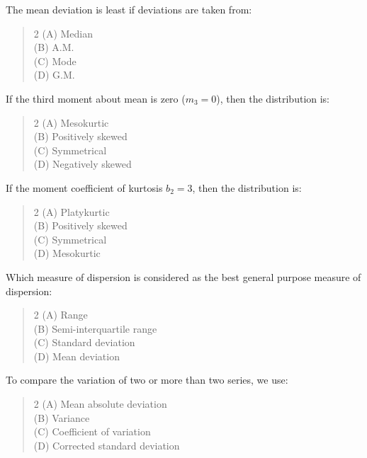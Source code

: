 \documentclass[11pt,a4paper]{article}
\begin{document}
\begin{mcqlist}
\item The mean deviation is least if deviations are taken from:
\begin{quote}\begin{multicols}{2}
\noindent (A) Median \\
(B) A.M. \\
(C) Mode \\
(D) G.M.
\end{multicols}\end{quote}

\item If the third moment about mean is zero ($m_3=0$), then the distribution is:
\begin{quote}\begin{multicols}{2}
\noindent (A) Mesokurtic \\
(B) Positively skewed \\
(C) Symmetrical \\
(D) Negatively skewed
\end{multicols}\end{quote}

\item If the moment coefficient of kurtosis $b_2=3$, then the distribution is:
\begin{quote}\begin{multicols}{2}
\noindent (A) Platykurtic \\
(B) Positively skewed \\
(C) Symmetrical \\
(D) Mesokurtic
\end{multicols}\end{quote}

\item Which measure of dispersion is considered as the best general purpose measure of dispersion:
\begin{quote}\begin{multicols}{2}
\noindent (A) Range \\
(B) Semi-interquartile range \\
(C) Standard deviation \\
(D) Mean deviation
\end{multicols}\end{quote}

\item To compare the variation of two or more than two series, we use:
\begin{quote}\begin{multicols}{2}
\noindent (A) Mean absolute deviation \\
(B) Variance \\
(C) Coefficient of variation \\
(D) Corrected standard deviation
\end{multicols}\end{quote}


\end{mcqlist}
\end{document}
